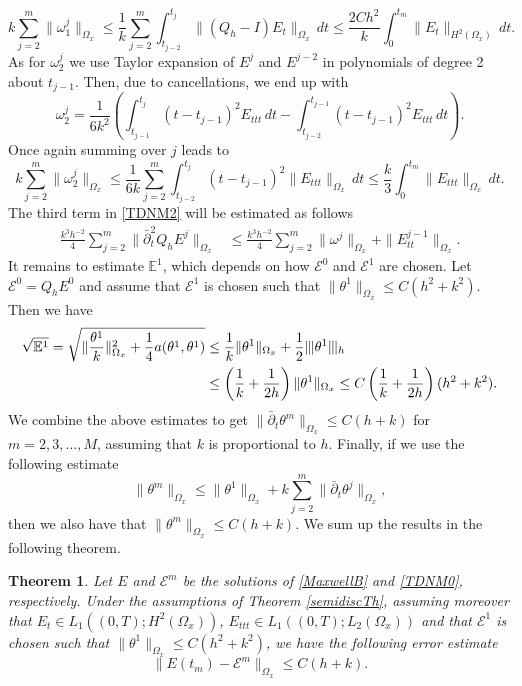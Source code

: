 \documentclass[reqno,a4paper]{amsart}
\newtheorem{theorem}{Theorem}[section]
\theoremstyle{remark}
\numberwithin{equation}{section}
\newcommand{\norm}[1]{\|#1\|}
\newcommand{\Tnorm}[1]{|\mkern-1mu|\mkern-1mu|#1|\mkern-1mu|\mkern-1mu|}
\def\dbart{\bar{\partial}_t}
\def\dbartt{\bar{\partial}_t^2}
\def\EE{\mathcal{E}}
\def\bbE{\mathbb{E}}
\begin{document}
\[
k \sum_{j = 2}^m \norm{\omega_1^j}_{\Omega_x} \leq \frac{1}{k} 
\sum_{j = 2}^m \int_{t_{j - 2}}^{t_j} \norm{(Q_h - I) E_t}_{\Omega_x} \, dt
\leq \frac{2C h^2}{k} \int_0^{t_m} \norm{E_t}_{H^2 (\Omega_x)} \, dt.
\]
As for $ \omega_2^j $ we use Taylor expansion of  $ E^j $ and $ E^{j - 2} $ 
in  polynomials of degree 2 about $ t_{j - 1} $.
Then, due to cancellations, we end up with 
\[
\omega_2^j = 
\frac{1}{6 k^2} \left( \int_{t_{j - 1}}^{t_j} (t - t_{j - 1})^2 E_{ttt} \, dt 
- \int_{t_{j - 2}}^{t_{j - 1}} (t - t_{j - 1})^2 E_{ttt} \, dt \right).
\]
Once again summing over $ j $ leads to
\[
k  \sum_{j = 2}^m \norm{\omega_2^j}_{\Omega_x} \leq \frac{1}{6 k}  
\sum_{j = 2}^m \int_{t_{j - 2}}^{t_j} (t - t_{j - 1})^2 \norm{E_{ttt}}_{\Omega_x} \, dt
\leq \frac{k}{3} \int_0^{t_m} \norm{E_{ttt}}_{\Omega_x} \, dt.
\]
The third term in \eqref{TDNM2} will be estimated as follows
\[
\begin{aligned}
\frac{k^3 h^{-2}}{4} \sum_{j = 2}^m \norm{\dbartt Q_h E^j}_{\Omega_x} &\leq
\frac{k^3 h^{-2}}{4} \sum_{j = 2}^m \norm{\omega^j}_{\Omega_x} + \norm{E_{tt}^{j - 1}}_{\Omega_x}.
\end{aligned}
\]
It remains to estimate $ \bbE^1 $, which depends on how $ \EE^0 $ and 
$ \EE^1 $ are chosen.
Let $ \EE^0 = Q_h E^0 $ and assume that $ \EE^1 $ 
is chosen such that $ \norm{\theta^1}_{\Omega_x} \leq C(h^2 + k^2) $.
Then we have
\begin{equation*}
\begin{aligned}
\sqrt{\bbE^1} = \sqrt{\norm{\frac{\theta^1}{k}}^2_{\Omega_x} 
+ \frac{1}{4} a(\theta^1, \theta^1)}
&\leq \frac{1}{k} \norm{\theta^1}_{\Omega_x} + \frac{1}{2} \Tnorm{\theta^1}_h\\
&\leq \left( \frac{1}{k} + \frac{1}{2 h} \right) 
\norm{\theta^1}_{\Omega_x} 
\leq C \left( \frac{1}{k} + \frac{1}{2 h} \right) (h^2 + k^2).
\end{aligned}
\end{equation*}
We combine the above estimates to get $ \norm{\dbart \theta^m}_{\Omega_x}
\leq C(h + k) $ for $ m = 2, 3, \ldots, M $,
assuming that $k$ is proportional to $h$.
Finally, if we use the following estimate
\[
\norm{\theta^m}_{\Omega_x} \leq \norm{\theta^1} _{\Omega_x}
+ k\sum_{j=2}^m \norm{\dbart \theta^j}_{\Omega_x},
\]
then we also have that $ \norm{\theta^m}_{\Omega_x} \leq C(h + k) $.
We sum up the results in the following theorem.
\begin{theorem}
Let $ E $ and $ \EE^m $ be the solutions of 
\eqref{MaxwellB} and \eqref{TDNM0}, respectively.
Under the assumptions of Theorem \ref{semidiscTh},
assuming moreover  that $ E_t \in L_1\left((0,T); H^2 ( \Omega_x)\right) $, 
$ E_{ttt} \in L_1 \left((0,T); L_2(\Omega_x)\right) $ 
and that $ \EE^1 $ is chosen such that $ \norm{\theta^1}_{\Omega_x} \leq C(h^2 + k^2) $,
we have the following error estimate
\[
\norm{E(t_m) - \EE^m}_{\Omega_x} \leq C(h + k).
\]
\end{theorem}
\end{document}
